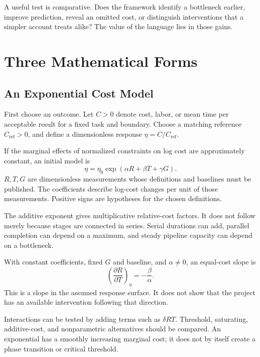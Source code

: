 \documentclass[11pt,openany]{book}
\begin{document}
A useful test is comparative. Does the framework identify a bottleneck earlier, improve prediction, reveal an omitted cost, or distinguish interventions that a simpler account treats alike? The value of the language lies in those gains.

\section{Three Mathematical Forms}

\subsection{An Exponential Cost Model}

First choose an outcome. Let $C>0$ denote cost, labor, or mean time per acceptable result for a fixed task and boundary. Choose a matching reference $C_{\mathrm{ref}}>0$, and define a dimensionless response $\eta=C/C_{\mathrm{ref}}$.

If the marginal effects of normalized constraints on log cost are approximately constant, an initial model is
\begin{equation}
 \eta=\eta_0\exp(\alpha R+\beta T+\gamma G).
\end{equation}
$R,T,G$ are dimensionless measurements whose definitions and baselines must be published. The coefficients describe log-cost changes per unit of those measurements. Positive signs are hypotheses for the chosen definitions.

The additive exponent gives multiplicative relative-cost factors. It does not follow merely because stages are connected in series. Serial durations can add, parallel completion can depend on a maximum, and steady pipeline capacity can depend on a bottleneck.

With constant coefficients, fixed $G$ and baseline, and $\alpha\neq0$, an equal-cost slope is
\begin{equation}
 \left(\frac{\partial R}{\partial T}\right)_\eta
 =-\frac{\beta}{\alpha}.
\end{equation}
This is a slope in the assumed response surface. It does not show that the project has an available intervention following that direction.

Interactions can be tested by adding terms such as $\delta RT$. Threshold, saturating, additive-cost, and nonparametric alternatives should be compared. An exponential has a smoothly increasing marginal cost; it does not by itself create a phase transition or critical threshold.
\end{document}
